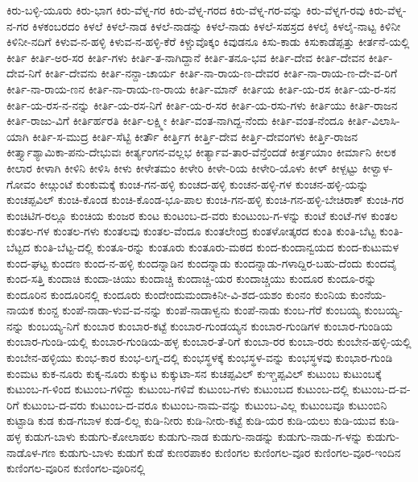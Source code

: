 ಕಿರು-ಬಳ್ಳಿ-ಯೂರು
ಕಿರು-ಭಾಗ
ಕಿರು-ವೆಳ್ನ-ಗರ
ಕಿರು-ವೆಳ್ನ-ಗರದ
ಕಿರು-ವೆಳ್ನ-ಗರ-ವನ್ನು
ಕಿರು-ವೆಳ್ನಗ-ರವು
ಕಿರು-ವೆಳ್ನ-ನ-ಗರ
ಕಿಳಕಂಬರದಂ
ಕಿಳಲೆ
ಕಿಳಲೆ-ನಾಡ
ಕಿಳಲೆ-ನಾಡನ್ನು
ಕಿಳಲೆ-ನಾಡು
ಕಿಳಲೆ-ಸಹಸ್ರದ
ಕಿಳಲೈ
ಕಿಳಲೈ-ನಾಟ್ಟ
ಕಿಳಿನೀ
ಕಿಳಿನೀ-ನದಿಗೆ
ಕಿಳುವ-ನ-ಹಳ್ಳಿ
ಕಿಳುವ-ನ-ಹಳ್ಳಿ-ಕೆರೆ
ಕಿಳ್ಚುವೊಕ್ಕಂ
ಕಿವುಡನೂ
ಕಿಸು-ಕಾಡು
ಕಿಸುಕಾಡೆಪ್ಪತ್ತು
ಕೀರ್ತನೆ-ಯಲ್ಲಿ
ಕೀರ್ತಿ
ಕೀರ್ತಿ-ಅರ-ಸರ
ಕೀರ್ತಿ-ಗಳು
ಕೀರ್ತಿ-ತ-ನಾಗಿದ್ದಾನೆ
ಕೀರ್ತಿ-ತನೂ-ಭವ
ಕೀರ್ತಿ-ದೇವ
ಕೀರ್ತಿ-ದೇವನ
ಕೀರ್ತಿ-ದೇವ-ನಿಗೆ
ಕೀರ್ತಿ-ದೇವನು
ಕೀರ್ತಿ-ನನ್ದಾ-ಚಾರ್ಯ
ಕೀರ್ತಿ-ನಾ-ರಾಯ-ಣ-ದೇವರ
ಕೀರ್ತಿ-ನಾ-ರಾಯ-ಣ-ದೇ-ವ-ರಿಗೆ
ಕೀರ್ತಿ-ನಾ-ರಾಯ-ಣನ
ಕೀರ್ತಿ-ನಾ-ರಾಯ-ಣ-ರಾಯ
ಕೀರ್ತಿ-ಮಾನ್
ಕೀರ್ತಿಯ
ಕೀರ್ತಿ-ಯ-ರಸ
ಕೀರ್ತಿ-ಯ-ರ-ಸನ
ಕೀರ್ತಿ-ಯ-ರಸ-ನ-ನನ್ನು
ಕೀರ್ತಿ-ಯ-ರಸ-ನಿಗೆ
ಕೀರ್ತಿ-ಯ-ರ-ಸರ
ಕೀರ್ತಿ-ಯ-ರಸು-ಗಳು
ಕೀರ್ತಿಯು
ಕೀರ್ತಿ-ರಾಜನ
ಕೀರ್ತಿ-ರಾಜು-ವಿಗೆ
ಕೀರ್ತಿರ್ಹರತಿ
ಕೀರ್ತಿ-ಲಕ್ಷ್ಮೀ
ಕೀರ್ತಿ-ವಂತ-ನಾಗಿದ್ದ-ನೆಂದು
ಕೀರ್ತಿ-ವಂತ-ನೆಂದೂ
ಕೀರ್ತಿ-ವಿಲಾಸಿ-ಯಾಗಿ
ಕೀರ್ತಿ-ಸ-ಮುದ್ರ
ಕೀರ್ತಿ-ಸೆಟ್ಟಿ
ಕೀರ್ತೌ
ಕೀರ್ತ್ತಿಗ
ಕೀರ್ತ್ತಿ-ದೇವ
ಕೀರ್ತ್ತಿ-ದೇವಂಗಳು
ಕೀರ್ತ್ತಿ-ರಾಜನ
ಕೀರ್ತ್ತ್ಯಾಶ್ಯಾಮಿಕಾ-ಪನು-ದೇಭುವಃ
ಕೀರ್ತ್ಯಂಗನ-ವಲ್ಲಭ
ಕೀರ್ತ್ಯಾವ-ತಾರ-ವೆನ್ತೆಂದಡೆ
ಕೀರ್ತ್ರಯಾಂ
ಕೀರ್ಮಾನಿ
ಕೀಲಕ
ಕೀಲಾರ
ಕೀಳಾಗಿ
ಕೀಳಿನಿ
ಕೀಳಿಸಿ
ಕೀಳು
ಕೀಳೇತಮಂ
ಕೀಳೇರಿ
ಕೀಳೇ-ರಿಯ
ಕೀಳೇರಿ-ಯೊಳು
ಕೀಳ್
ಕೀಳ್ಪಟ್ಟು
ಕೀಳ್ವಾಳ-ಗೋವಂ
ಕೀೞ್ಗುಂಟೆ
ಕುಂಕುಮಕ್ಕೆ
ಕುಂಚ-ಗನ-ಹಳ್ಳಿ
ಕುಂಚದ-ಹಳ್ಳಿ
ಕುಂಚನ-ಹಳ್ಳಿ-ಗಳ
ಕುಂಚನ-ಹಳ್ಳಿ-ಯನ್ನು
ಕುಂಚಪ್ಪವಿಲ್
ಕುಂಚಿ-ಕೊಂಡ
ಕುಂಚಿ-ಕೊಂಡ-ಭೂ-ಪಾಲ
ಕುಂಚಿ-ಗನ-ಹಳ್ಳಿ
ಕುಂಚಿ-ಗನ-ಹಳ್ಳಿ-ಬೇಚಿರಾಕ್
ಕುಂಚಿ-ಗರ
ಕುಂಚಿಟಿಗ-ರಲ್ಲೂ
ಕುಂಚಿಯ
ಕುಂಜರ
ಕುಂಟ
ಕುಂಟಂಬ-ದ-ವರು
ಕುಂಟುಂಬ-ಗ-ಳನ್ನು
ಕುಂಟೆ
ಕುಂಟೆ-ಗಳ
ಕುಂತಲ
ಕುಂತಲ-ಗಳ
ಕುಂತಲ-ಗಳು
ಕುಂತಲವು
ಕುಂತಲ-ವೆಂದೂ
ಕುಂತಲೇಂದ್ರ
ಕುಂತಳೋತ್ಕರದ
ಕುಂತಿ
ಕುಂತಿ-ಬೆಟ್ಟ
ಕುಂತಿ-ಬೆಟ್ಟದ
ಕುಂತಿ-ಬೆಟ್ಟ-ದಲ್ಲಿ
ಕುಂತೂ-ರನ್ನು
ಕುಂತೂರು
ಕುಂತೂರು-ಮಠದ
ಕುಂದ-ಕುಂದಾನ್ವಯದ
ಕುಂದ-ಕುಟುಮಳ
ಕುಂದ-ಘಟ್ಟ
ಕುಂದಣ
ಕುಂದ-ನ-ಹಳ್ಳಿ
ಕುಂದನ್ನಾಡಿನ
ಕುಂದನ್ನಾಡು
ಕುಂದನ್ನಾಡು-ಗಳಾದ್ದಿರ-ಬಹು-ದೆಂದು
ಕುಂದವೈ
ಕುಂದ-ಸತ್ತಿ
ಕುಂದಾಚಿ
ಕುಂದಾ-ಚಿಯು
ಕುಂದಾಚ್ಚಿ
ಕುಂದಾಚ್ಚಿ-ಯರ
ಕುಂದಾಚ್ಚಿಯು
ಕುಂದೂರ
ಕುಂದೂ-ರನ್ನು
ಕುಂದೂರಿನ
ಕುಂದೂರಿನಲ್ಲಿ
ಕುಂದೂರು
ಕುಂದೇಂದುಮಂದಾಕಿನೀ-ವಿ-ಶದ-ಯಶಂ
ಕುಂನಂ
ಕುಂನಿಯ
ಕುಂನೆಯ-ನಾಯಕ
ಕುಂನ್ದ
ಕುಂಪೆ-ನಾಡಾ-ಳುವ-ವ-ನನ್ನು
ಕುಂಪೆ-ನಾಡಾಳ್ವನು
ಕುಂಪೆ-ನಾಡು
ಕುಂಬ-ಗೆರೆ
ಕುಂಬಯ್ಯ
ಕುಂಬಯ್ಯ-ನನ್ನು
ಕುಂಬಯ್ಯ-ನಿಗೆ
ಕುಂಬಾರ
ಕುಂಬಾರ-ಕಟ್ಟೆ
ಕುಂಬಾರ-ಗುಂಡಯ್ಯನ
ಕುಂಬಾರ-ಗುಂಡಿಗಳ
ಕುಂಬಾರ-ಗುಂಡಿಯ
ಕುಂಬಾರ-ಗುಂಡಿ-ಯಲ್ಲಿ
ಕುಂಬಾರ-ಗುಂಡಿಯ-ಹಳ್ಳ
ಕುಂಬಾರ-ತೆ-ರಿಗೆ
ಕುಂಬಾ-ರರ
ಕುಂಬಾ-ರರು
ಕುಂಬೇನ-ಹಳ್ಳಿ-ಯಲ್ಲಿ
ಕುಂಬೇನ-ಹಳ್ಳಿಯು
ಕುಂಭ-ಕಾರ
ಕುಂಭ-ಲಗ್ನ-ದಲ್ಲಿ
ಕುಂಭಸ್ಥಳಕ್ಕೆ
ಕುಂಭಸ್ಥಳ-ವನ್ನು
ಕುಂಭಸ್ಥಳವು
ಕುಂಭಾರ-ಗುಂಡಿ
ಕುಂಮಟ
ಕುಕ-ನೂರು
ಕುಕ್ಕ-ನೂರು
ಕುಕ್ಕುಟ
ಕುಕ್ಕುಟಾ-ಸನ
ಕುಚಪ್ಪವಿಲ್
ಕುಞ್ಚಪ್ಪವಿಲ್
ಕುಟುಂಬ
ಕುಟುಂಬಕ್ಕೆ
ಕುಟುಂಬ-ಗ-ಳಿಂದ
ಕುಟುಂಬ-ಗಳಿದ್ದು
ಕುಟುಂಬ-ಗಳಿವೆ
ಕುಟುಂಬ-ಗಳು
ಕುಟುಂಬದ
ಕುಟುಂಬ-ದಲ್ಲಿ
ಕುಟುಂಬ-ದ-ವ-ರಿಗೆ
ಕುಟುಂಬ-ದ-ವರು
ಕುಟುಂಬ-ದ-ವರೂ
ಕುಟುಂಬ-ನಾಮ-ವನ್ನು
ಕುಟುಂಬ-ವಿಲ್ಲ
ಕುಟುಂಬವೂ
ಕುಟುಂಬಿನಿ
ಕುಟ್ಟಾಡಿ
ಕುಡ
ಕುಡ-ಗಬಾಳ
ಕುಡ-ಲಿಲ್ಲ
ಕುಡಿ-ನೀರು
ಕುಡಿ-ನೀರು-ಕಟ್ಟೆ
ಕುಡಿ-ಯರ
ಕುಡಿ-ಯಲು
ಕುಡಿ-ಯುವ
ಕುಡಿ-ಹಳ್ಳ
ಕುಡುಗ-ಬಾಳು
ಕುಡುಗು-ಕೋಲಾಹಲ
ಕುಡುಗು-ನಾಡ
ಕುಡುಗು-ನಾಡನ್ನು
ಕುಡುಗು-ನಾಡು-ಗ-ಳನ್ನು
ಕುಡುಗು-ನಾಡೊಳ-ಗಣ
ಕುಡುಗು-ಬಾಳು
ಕುಡುಗೆ
ಕುಡೆ
ಕುಣರಪಾಕಂ
ಕುಣಿಂಗಲ
ಕುಣಿಂಗಲ-ವೂರ
ಕುಣಿಂಗಲ-ವೂರ-ಇಂದಿನ
ಕುಣಿಂಗಲ-ವೂರಿನ
ಕುಣಿಂಗಲ-ವೂರಿನಲ್ಲಿ
